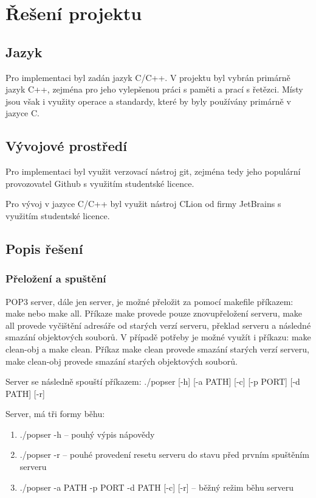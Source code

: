 \documentclass[11pt,a4paper]{report}
\begin{document}
    \clearpage
    \section{Řešení projektu}
    \subsection{Jazyk}
    Pro implementaci byl zadán jazyk C/C++. V projektu byl vybrán primárně jazyk C++, zejména pro jeho vylepšenou práci s paměti a prací s řetězci. Místy jsou však i využity operace a standardy, které by byly používány primárně v jazyce C.
    \subsection{Vývojové prostředí}
    Pro implementaci byl využit verzovací nástroj git, zejména tedy jeho populární provozovatel Github s využitím studentské licence.\par
    Pro vývoj v jazyce C/C++ byl využit nástroj CLion od firmy JetBrains s využitím studentské licence.
    \subsection{Popis řešení}
    \subsubsection{Přeložení a spuštění}
    \label{subsec:makeandrun}
    POP3 server, dále jen server, je možné přeložit za pomocí makefile příkazem: make nebo make all. Příkaze make provede pouze znovupřeložení serveru, make all provede vyčištění adresáře od starých verzí serveru, překlad serveru a následné smazání objektových souborů.
    V případě potřeby je možné využít i příkazu: make clean-obj a make clean. Příkaz make clean provede smazání starých verzí serveru, make clean-obj provede smazání starých objektových souborů.\par
    Server se následně spouští příkazem: ./popser [-h] [-a PATH] [-c] [-p PORT] [-d PATH] [-r]\par
    Server, má tři formy běhu:
    \begin{enumerate}
        \item ./popser -h -- pouhý výpis nápovědy
        \item ./popser -r -- pouhé provedení resetu serveru do stavu před prvním spuštěním serveru
        \item ./popser -a PATH -p PORT -d PATH [-c] [-r] -- běžný režim běhu serveru
    \end{enumerate}
\end{document}
